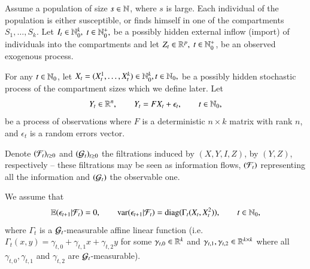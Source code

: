 \documentclass[english]{elsarticle}
\theoremstyle{plain}
\theoremstyle{remark}
\theoremstyle{plain}
\theoremstyle{definition}
\begin{document}
\label{sec:Model-Definition}Assume a population of size $s\in\mathbb{N}$,
where $s$ is large. Each individual of the population is either susceptible,
or finds himself in one of the compartments $S_{1},\dots,S_{k}$.
Let $I_{t}\in\mathbb{N}_{0}^{k},$ $t\in\mathbb{N}_{0}^{+},$ be a possibly hidden
external inflow (import) of individuals into the compartments and
let $Z_{t}\in\mathbb{R}^{p},$ $t\in\mathbb{N}_{0}^{+}$, be an observed exogenous
process.

For any $t\in\mathbb{N}_{0}$, let $X_{t}=(X_{t}^{1},\dots,X_{t}^{k})\in\mathbb{N}_{0}^{k},t\in\mathbb{N}_{0},$
be a possibly hidden stochastic process of the compartment sizes which
we define later. Let 
\[
Y_{t}\in\mathbb{R}^{n},\qquad Y_{t}=FX_{t}+\epsilon_{t},\qquad t\in\mathbb{N}_{0},
\]
be a process of observations where $F$ is a deterministic $n\times k$
matrix with rank $n$, and $\epsilon_{t}$ is a random errors vector. 

Denote $(\mathcal{F}_{t})_{t\geq0}$ and $(\mathcal{G}_{t})_{t\geq0}$ the filtrations
induced by $(X,Y,I,Z)$, by $(Y,Z)$, respectively -- these filtrations
may be seen as information flows, $(\mathcal{F}_{t})$ representing all the
information and $(\mathcal{G}_{t})$ the observable one. 

We assume that 
\[
\mathbb{E}(\epsilon_{t+1}|\mathcal{F}_{t})=0,\qquad\mathrm{var}(\epsilon_{t+1}|\mathcal{F}_{t})=\mathrm{diag(}\Gamma_{t}(X_{t},X_{t}^{2})),\qquad t\in\mathbb{N}_{0},
\]
where $\Gamma_{t}$ is a $\mathcal{G}_{t}$-measurable affine linear function
(i.e. $\Gamma_{t}(x,y)=\gamma_{t,0}+\gamma_{t,1}x+\gamma_{t,2}y$
for some $\gamma_{t,0}\in\mathbb{R}^{k}$ and $\gamma_{t,1},\gamma_{t,2}\in\mathbb{R}^{k\times k}$
where all $\gamma_{t,0},\gamma_{t,1}$ and $\gamma_{t,2}$ are $\mathcal{G}_{t}$-measurable). 
\end{document}
